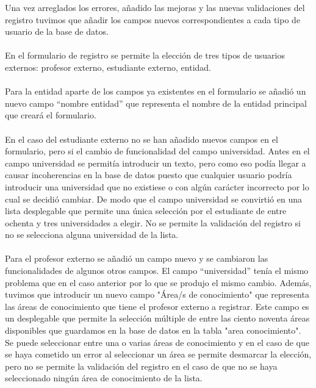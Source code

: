 \documentclass[11pt]{article}
\begin{document}
Una vez arreglados los errores, añadido las mejoras y las nuevas validaciones del registro tuvimos que añadir los campos nuevos correspondientes a cada tipo de usuario de la base de datos. \\\\
En el formulario de registro se permite la elección de tres tipos de usuarios externos: profesor externo, estudiante externo, entidad.\\\\
Para la entidad aparte de los campos ya existentes en el formulario se añadió un nuevo campo “nombre entidad” que representa el nombre de la entidad principal que creará el formulario.\\\\
En el caso del estudiante externo no se han añadido nuevos campos en el formulario, pero si el cambio de funcionalidad del campo universidad. Antes en el campo universidad se permitía introducir un texto, pero como eso podía llegar a causar incoherencias en la base de datos puesto que cualquier usuario podría introducir una universidad que no existiese o con algún carácter incorrecto por lo cual se decidió cambiar. De modo que el campo universidad se convirtió en una lista desplegable que permite una única selección por el estudiante de entre ochenta y tres universidades a elegir.  No se permite la validación del registro si no se selecciona alguna universidad de la lista. \\\\
Para el profesor externo se añadió un campo nuevo y se cambiaron las funcionalidades de algunos otros campos. El campo “universidad” tenía el mismo problema que en el caso anterior por lo que se produjo el mismo cambio. Además, tuvimos que introducir un nuevo campo "Área/s de conocimiento" que representa las áreas de conocimiento que tiene el profesor externo a registrar. Este campo es un desplegable que permite la selección múltiple de entre las ciento noventa áreas disponibles que guardamos en la base de datos en la tabla "area conocimiento". Se puede seleccionar entre una o varias áreas de conocimiento y en el caso de que se haya cometido un error al seleccionar un área se permite desmarcar la elección, pero no se permite la validación del registro en el caso de que no se haya seleccionado ningún área de conocimiento de la lista.\\\\
\end{document}

